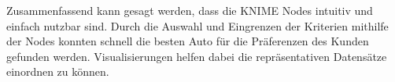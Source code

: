 Zusammenfassend kann gesagt werden, dass die KNIME Nodes intuitiv und einfach nutzbar sind. Durch die Auswahl und Eingrenzen der Kriterien mithilfe der Nodes konnten schnell die besten Auto für die Präferenzen des Kunden gefunden werden. Visualisierungen helfen dabei die repräsentativen Datensätze einordnen zu können. 
